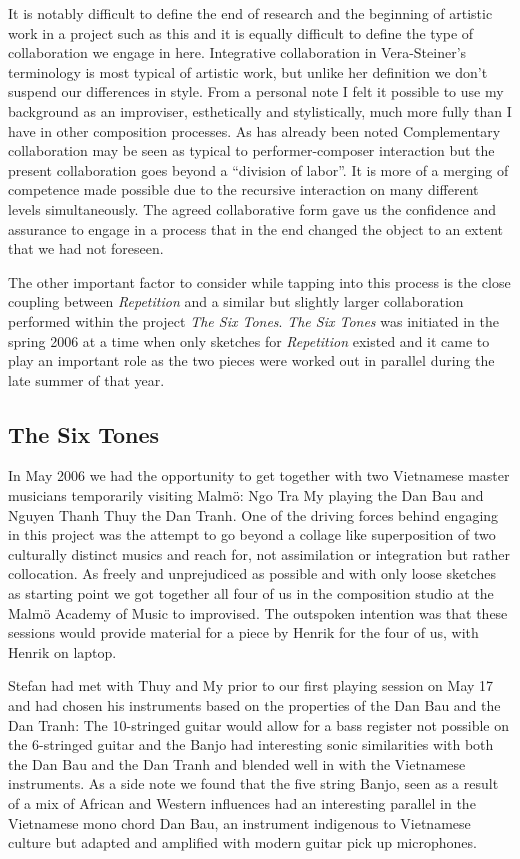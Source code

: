 It is notably difficult to define the end of research and the
beginning of artistic work in a project such as this and it is equally
difficult to define the type of collaboration we engage in
here. Integrative collaboration in Vera-Steiner's terminology is most
typical of artistic work, but unlike her definition we don't suspend
our differences in style. From a personal note I felt it possible to
use my background as an improviser, esthetically and stylistically,
much more fully than I have in other composition processes. As has
already been noted Complementary collaboration may be seen as typical
to performer-composer interaction but the present collaboration goes
beyond a ``division of labor''. It is more of a merging of competence
made possible due to the recursive interaction on many different
levels simultaneously. The agreed collaborative form gave us the
confidence and assurance to engage in a process that in the end
changed the object to an extent that we had not foreseen.

The other important factor to consider while tapping into this process is
the close coupling between \emph{Repetition} and a similar but
slightly larger collaboration performed within the project \emph{The
  Six Tones}. \emph{The Six Tones} was initiated in the spring 2006 at
a time when only sketches for \emph{Repetition} existed and it came to
play an important role as the two pieces were worked out in parallel
during the late summer of that year.

\subsection{The Six Tones}
\label{sec:six-tones}

In May 2006 we had the opportunity to get together with two Vietnamese
master musicians temporarily visiting Malm\"{o}: Ngo Tra My playing the
Dan Bau and Nguyen Thanh Thuy the Dan Tranh. One of the driving forces
behind engaging in this project was the attempt to go beyond a collage
like superposition of two culturally distinct musics and reach for,
not assimilation or integration but rather collocation. As freely and
unprejudiced as possible and with only loose sketches as starting
point we got together all four of us in the composition studio at the
Malm\"{o} Academy of Music to improvised. The outspoken intention was
that these sessions would provide material for a piece by Henrik for
the four of us, with Henrik on laptop.

Stefan had met with Thuy and My prior to our first playing session on
May 17 and had chosen his instruments based on the properties of the
Dan Bau and the Dan Tranh: The 10-stringed guitar would allow for a
bass register not possible on the 6-stringed guitar and the Banjo had
interesting sonic similarities with both the Dan Bau and the Dan
Tranh and blended well in with the Vietnamese instruments. As a side
note we found that the five string Banjo, seen as a result of a mix of
African and Western influences had an interesting parallel in the
Vietnamese mono chord Dan Bau, an instrument indigenous to Vietnamese
culture but adapted and amplified with modern guitar pick up
microphones.

